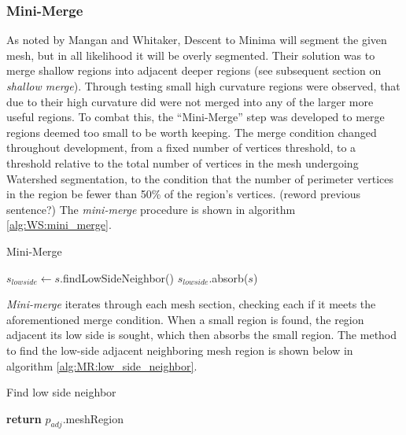 \subsubsection{Mini-Merge}
As noted by Mangan and Whitaker, Descent to Minima will segment the given mesh, but in all likelihood it will be overly segmented.
Their solution was to merge shallow regions into adjacent deeper regions (see subsequent section on \textit{shallow merge}).
Through testing small high curvature regions were observed, that due to their high curvature did were not merged into any of the larger more useful regions.
To combat this, the ``Mini-Merge'' step was developed to merge regions deemed too small to be worth keeping.
The merge condition changed throughout development, from a fixed number of vertices threshold, to a threshold relative to the total number of vertices in the mesh undergoing Watershed segmentation, to the condition that the number of perimeter vertices in the region be fewer than 50\% of the region's vertices.
(reword previous sentence?)
The \textit{mini-merge} procedure is shown in algorithm \ref{alg:WS:mini_merge}.

\begin{algorithm}[htb]
\caption{Mini-Merge}\label{alg:WS:mini_merge}
\begin{algorithmic}[1]
			\State $s_{lowside} \leftarrow s$.findLowSideNeighbor()
			\State $s_{lowside}$.absorb($s$)
		\EndIf
	\EndFor
\EndFunction
\end{algorithmic}
\end{algorithm}

\textit{Mini-merge} iterates through each mesh section, checking each if it meets the aforementioned merge condition.
When a small region is found, the region adjacent its low side is sought, which then absorbs the small region.
The method to find the low-side adjacent neighboring mesh region is shown below in algorithm \ref{alg:MR:low_side_neighbor}.

\begin{algorithm}[htb]
\caption{Find low side neighbor}\label{alg:MR:low_side_neighbor}
\begin{algorithmic}[1]
				\State \textbf{return} $p_{adj}$.meshRegion
			\EndIf
		\EndFor
	\EndFor
\EndFunction
\end{algorithmic}
\end{algorithm}

